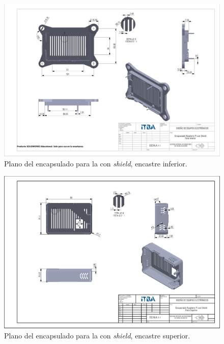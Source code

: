 \begin{figure}[H]
	\centering
	\includegraphics[width=\linewidth]{ImagenesApendice/RpiCasingBottom}
	\caption{Plano del encapsulado para la \rspi con \textit{shield}, encastre inferior.}
	\label{fig:RpiCasingBottom}
\end{figure}

\begin{figure}[H]
	\centering
	\includegraphics[width=\linewidth]{ImagenesApendice/RpiCasingTop}
	\caption{Plano del encapsulado para la \rspi con \textit{shield}, encastre superior.}
	\label{fig:RpiCasingTop}
\end{figure}

